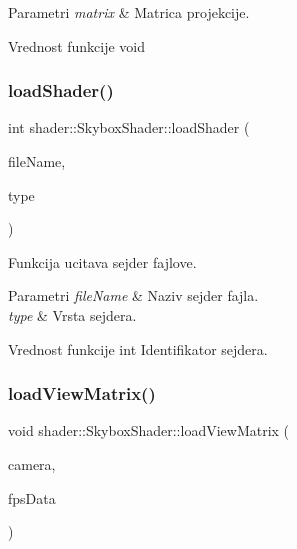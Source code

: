 \begin{DoxyParams}{Parametri}
{\em matrix} & Matrica projekcije. \\
\hline
\end{DoxyParams}
\begin{DoxyReturn}{Vrednost funkcije}
void 
\end{DoxyReturn}
\mbox{\label{classshader_1_1SkyboxShader_a3d221aee6e11f91ea59332956e5edcbb}} 
\subsubsection{\texorpdfstring{load\+Shader()}{loadShader()}}
{\footnotesize\ttfamily int shader\+::\+Skybox\+Shader\+::load\+Shader (\begin{DoxyParamCaption}\item[{const char $\ast$}]{file\+Name,  }\item[{G\+Lenum}]{type }\end{DoxyParamCaption})\hspace{0.3cm}{\ttfamily [private]}}



Funkcija ucitava sejder fajlove. 


\begin{DoxyParams}{Parametri}
{\em file\+Name} & Naziv sejder fajla. \\
\hline
{\em type} & Vrsta sejdera. \\
\hline
\end{DoxyParams}
\begin{DoxyReturn}{Vrednost funkcije}
int Identifikator sejdera. 
\end{DoxyReturn}
\mbox{\label{classshader_1_1SkyboxShader_ad9d6069bb62fc7b3bfb6e8ee0bfe8784}} 
\subsubsection{\texorpdfstring{load\+View\+Matrix()}{loadViewMatrix()}}
{\footnotesize\ttfamily void shader\+::\+Skybox\+Shader\+::load\+View\+Matrix (\begin{DoxyParamCaption}\item[{\hyperlink{classentity_1_1Camera}{Camera} $\ast$}]{camera,  }\item[{\hyperlink{classutility_1_1FpsData}{Fps\+Data} $\ast$}]{fps\+Data }\end{DoxyParamCaption})}




